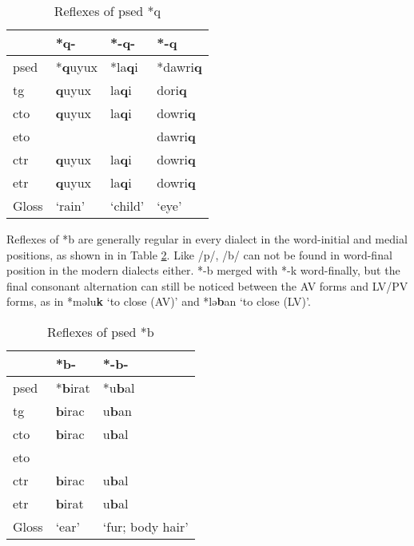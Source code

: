 \begin{table}[!htbp]
\centering
\caption{Reflexes of \acl{psed} *q}
\label{tab:psed_q}
\begin{tabular}{llll}
\hline
           & *q-    & *-q-    & *-q     \\ \hline
\acs{psed} & *\textbf{q}uyux & *la\textbf{q}i   & *dawri\textbf{q}  \\ \hdashline
\acs{tg}   & \textbf{q}uyux  & la\textbf{q}i    & dori\textbf{q}   \\
\acs{cto}  & \textbf{q}uyux  & la\textbf{q}i    & dowri\textbf{q}   \\
\acs{eto}  &        &         & dawri\textbf{q}  \\
\acs{ctr}  & \textbf{q}uyux  & la\textbf{q}i    & dowri\textbf{q}   \\
\acs{etr}  & \textbf{q}uyux  & la\textbf{q}i    & dowri\textbf{q}   \\ \hline
Gloss      & `rain' & `child' & `eye' \\ \hline
\end{tabular}
\end{table}

Reflexes of *b are generally regular in every dialect in the word-initial and medial positions, as shown in  in Table \ref{tab:psed_b}. Like /p/, /b/ can not be found in word-final position in the modern dialects either. *-b merged with *-k word-finally, but the final consonant alternation can still be noticed between the AV forms and LV/PV forms, as in *məlu\textbf{k} `to close (AV)' and *lə\textbf{b}an `to close (LV)'. 

\begin{table}[!htbp]
\centering
\caption{Reflexes of \acl{psed} *b}
\label{tab:psed_b}
\begin{tabular}{lll}
\hline
           & *b-    & *-b-             \\ \hline
\acs{psed} & *\textbf{b}irat & *u\textbf{b}al            \\ \hdashline
\acs{tg}   & \textbf{b}irac  & u\textbf{b}an             \\
\acs{cto}  & \textbf{b}irac  & u\textbf{b}al             \\
\acs{eto}  &        &                  \\
\acs{ctr}  & \textbf{b}irac  & u\textbf{b}al             \\
\acs{etr}  & \textbf{b}irat  & u\textbf{b}al             \\ \hline
Gloss      & `ear'  & `fur; body hair' \\ \hline
\end{tabular}
\end{table}

